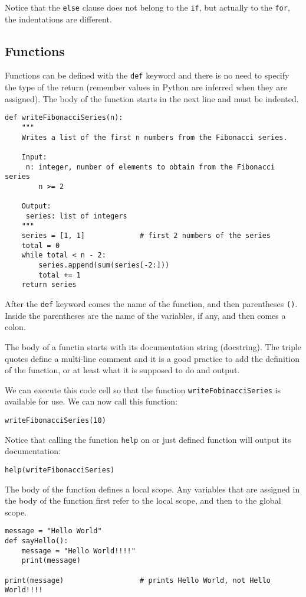 \documentclass[12pt, a4paper]{article}
\begin{document}
Notice that the \texttt{else} clause does not belong to the \texttt{if}, but actually to the \texttt{for}, the indentations are different.
\subsection{Functions}
\label{sec:orge44d3d8}
Functions can be defined with the \texttt{def} keyword and there is no need to specify the type of the return (remember values in Python are inferred when they are assigned).
The body of the function starts in the next line and must be indented.
\lstset{language=jupyter-python,label= ,caption= ,captionpos=b,numbers=none}
\begin{lstlisting}
def writeFibonacciSeries(n):
    """
    Writes a list of the first n numbers from the Fibonacci series.

    Input:
     n: integer, number of elements to obtain from the Fibonacci series
        n >= 2

    Output:
     series: list of integers
    """
    series = [1, 1]             # first 2 numbers of the series
    total = 0
    while total < n - 2:
        series.append(sum(series[-2:]))
        total += 1
    return series
\end{lstlisting}
After the \texttt{def} keyword comes the name of the function, and then parentheses \texttt{()}. Inside the parentheses are the name of the variables, if any, and then comes a colon.

The body of a functin starts with its documentation string (docstring). The triple quotes define a multi-line comment and it is a good practice to add the definition of the function, or at least what it is supposed to do and output.

We can execute this code cell so that the function \texttt{writeFobinacciSeries} is available for use.
We can now call this function:
\lstset{language=jupyter-python,label= ,caption= ,captionpos=b,numbers=none}
\begin{lstlisting}
writeFibonacciSeries(10)
\end{lstlisting}

Notice that calling the function \texttt{help} on or just defined function will output its documentation:
\lstset{language=jupyter-python,label= ,caption= ,captionpos=b,numbers=none}
\begin{lstlisting}
help(writeFibonacciSeries)
\end{lstlisting}

The body of the function defines a local scope.
Any variables that are assigned in the body of the function first refer to the local scope, and then to the global scope.
\lstset{language=jupyter-python,label= ,caption= ,captionpos=b,numbers=none}
\begin{lstlisting}
message = "Hello World"
def sayHello():
    message = "Hello World!!!!"
    print(message)

print(message)                  # prints Hello World, not Hello World!!!!
\end{lstlisting}
\end{document}
